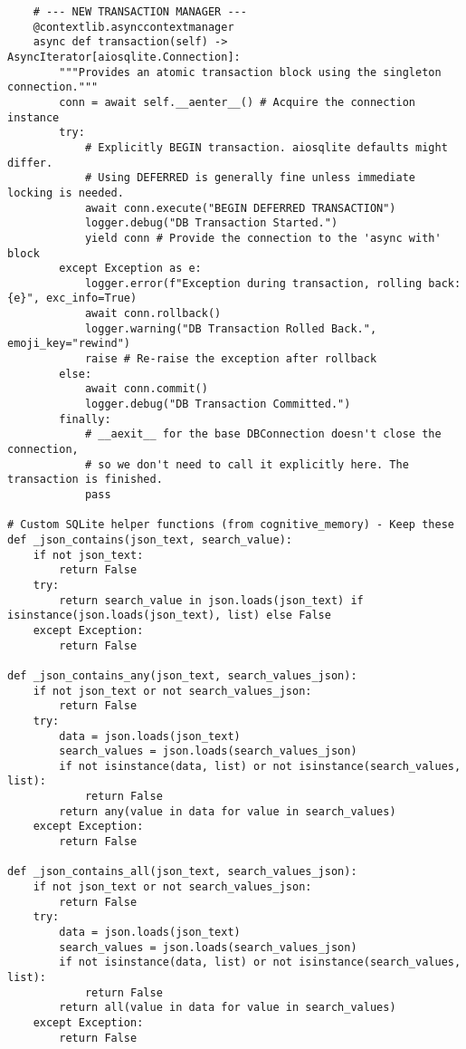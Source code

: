 \documentclass[12pt,a4paper]{article}
\begin{document}
\begin{pageablecode}
\begin{verbatim}
    # --- NEW TRANSACTION MANAGER ---
    @contextlib.asynccontextmanager
    async def transaction(self) -> AsyncIterator[aiosqlite.Connection]:
        """Provides an atomic transaction block using the singleton connection."""
        conn = await self.__aenter__() # Acquire the connection instance
        try:
            # Explicitly BEGIN transaction. aiosqlite defaults might differ.
            # Using DEFERRED is generally fine unless immediate locking is needed.
            await conn.execute("BEGIN DEFERRED TRANSACTION")
            logger.debug("DB Transaction Started.")
            yield conn # Provide the connection to the 'async with' block
        except Exception as e:
            logger.error(f"Exception during transaction, rolling back: {e}", exc_info=True)
            await conn.rollback()
            logger.warning("DB Transaction Rolled Back.", emoji_key="rewind")
            raise # Re-raise the exception after rollback
        else:
            await conn.commit()
            logger.debug("DB Transaction Committed.")
        finally:
            # __aexit__ for the base DBConnection doesn't close the connection,
            # so we don't need to call it explicitly here. The transaction is finished.
            pass

# Custom SQLite helper functions (from cognitive_memory) - Keep these
def _json_contains(json_text, search_value):
    if not json_text: 
        return False
    try: 
        return search_value in json.loads(json_text) if isinstance(json.loads(json_text), list) else False
    except Exception: 
        return False

def _json_contains_any(json_text, search_values_json):
    if not json_text or not search_values_json: 
        return False
    try:
        data = json.loads(json_text)
        search_values = json.loads(search_values_json)
        if not isinstance(data, list) or not isinstance(search_values, list): 
            return False
        return any(value in data for value in search_values)
    except Exception: 
        return False

def _json_contains_all(json_text, search_values_json):
    if not json_text or not search_values_json: 
        return False
    try:
        data = json.loads(json_text)
        search_values = json.loads(search_values_json)
        if not isinstance(data, list) or not isinstance(search_values, list): 
            return False
        return all(value in data for value in search_values)
    except Exception: 
        return False


\end{verbatim}
\end{pageablecode}
\end{document}
